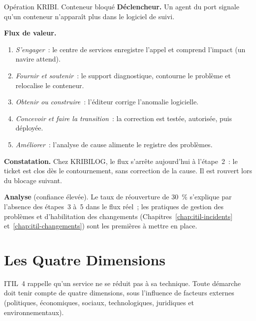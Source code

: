 \begin{boxscenario}{Opération KRIBI. Conteneur bloqué}
\textbf{Déclencheur.} Un agent du port signale qu'un conteneur n'apparaît
plus dans le logiciel de suivi.

\medskip
\textbf{Flux de valeur.}
\begin{enumerate}
    \item \emph{S'engager}~: le centre de services enregistre l'appel et
          comprend l'impact (un navire attend).
    \item \emph{Fournir et soutenir}~: le support diagnostique, contourne
          le problème et relocalise le conteneur.
    \item \emph{Obtenir ou construire}~: l'éditeur corrige l'anomalie
          logicielle.
    \item \emph{Concevoir et faire la transition}~: la correction est
          testée, autorisée, puis déployée.
    \item \emph{Améliorer}~: l'analyse de cause alimente le registre des
          problèmes.
\end{enumerate}

\textbf{Constatation.} Chez KRIBILOG, le flux s'arrête aujourd'hui à
l'étape~2~: le ticket est clos dès le contournement, sans correction de
la cause. Il est rouvert lors du blocage suivant.

\medskip
\textbf{Analyse} (confiance élevée). Le taux de réouverture de 30~\%
s'explique par l'absence des étapes~3 à~5 dans le flux réel~; les
pratiques de gestion des problèmes et d'habilitation des changements
(Chapitres~\ref{chap:itil-incidents} et~\ref{chap:itil-changements}) sont
les premières à mettre en place.
\end{boxscenario}

\section{Les Quatre Dimensions}
\label{sec:c12-dimensions}

ITIL~4 rappelle qu'un service ne se réduit pas à sa technique. Toute
démarche doit tenir compte de quatre dimensions, sous l'influence de
facteurs externes (politiques, économiques, sociaux, technologiques,
juridiques et environnementaux).

